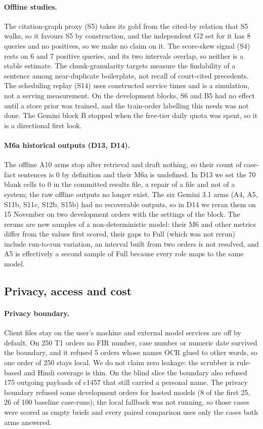 \paragraph{Offline studies.} The citation-graph proxy (S5) takes its gold from the cited-by relation that S5 walks, so it favours S5 by construction, and the independent G2 set for it has 8 queries and no positives, so we make no claim on it. The score-skew signal (S4) rests on 6 and 7 positive queries, and its two intervals overlap, so neither is a stable estimate. The chunk-granularity targets measure the findability of a sentence among near-duplicate boilerplate, not recall of court-cited precedents. The scheduling replay (S14) uses constructed service times and is a simulation, not a serving measurement. On the development blocks, S6 and B5 had no effect until a store prior was trained, and the train-order labelling this needs was not done. The Gemini block B stopped when the free-tier daily quota was spent, so it is a directional first look.

\paragraph{M6a historical outputs (D13, D14).} The offline A10 arms stop after retrieval and draft nothing, so their count of case-fact sentences is 0 by definition and their M6a is undefined. In D13 we set the 70 blank cells to 0 in the committed results file, a repair of a file and not of a system; the raw offline outputs no longer exist. The six Gemini 3.1 arms (A4, A5, S11b, S11c, S12b, S15b) had no recoverable outputs, so in D14 we reran them on 15 November on two development orders with the settings of the block. The reruns are new samples of a non-deterministic model: their M6 and other metrics differ from the values first scored, their gaps to Full (which was not rerun) include run-to-run variation, an interval built from two orders is not resolved, and A5 is effectively a second sample of Full because every role maps to the same model.

\subsection{Privacy, access and cost}

\paragraph{Privacy boundary.} Client files stay on the user's machine and external model services are off by default. On 250 T1 orders no FIR number, case number or numeric date survived the boundary, and it refused 5 orders whose names OCR glued to other words, so one order of 250 stays local. We do not claim zero leakage: the scrubber is rule-based and Hindi coverage is thin. On the blind slice the boundary also refused 175 outgoing payloads of c1457 that still carried a personal name. The privacy boundary refused some development orders for hosted models (8 of the first 25, 26 of 100 baseline case-runs); the local fallback was not running, so those cases were scored as empty briefs and every paired comparison uses only the cases both arms answered.

